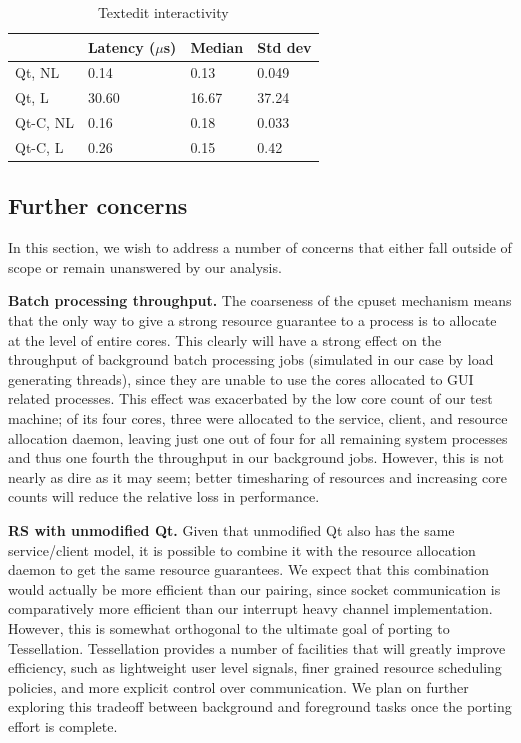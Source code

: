 \documentclass[letterpaper,twocolumn,11pt]{article}
\begin{document}
\begin{table}[htp]
\centering
\begin{tabular}{|l | l | l | l |}
\hline
	&Latency ($\mu$s)	&Median	&Std dev\\ \hline
Qt, NL	&0.14	&0.13	&0.049\\
Qt, L	&30.60	&16.67	&37.24\\
Qt-C, NL	&0.16	&0.18	&0.033\\
Qt-C, L	&0.26	&0.15	&0.42\\
\hline
\end{tabular}
\caption{Textedit interactivity}
\label{tab:textedit_table}
\end{table}

\subsection{Further concerns}

In this section, we wish to address a number of concerns that either fall outside of scope or remain unanswered by our analysis.

\textbf{Batch processing throughput.} The coarseness of the cpuset mechanism means that the only way to give a strong resource guarantee to a process is to allocate at the level of entire cores. This clearly will have a strong effect on the throughput of background batch processing jobs (simulated in our case by load generating threads), since they are unable to use the cores allocated to GUI related processes. This effect was exacerbated by the low core count of our test machine; of its four cores, three were allocated to the service, client, and resource allocation daemon, leaving just one out of four for all remaining system processes and thus one fourth the throughput in our background jobs. However, this is not nearly as dire as it may seem; better timesharing of resources and increasing core counts will reduce the relative loss in performance.

\textbf{RS with unmodified Qt.} Given that unmodified Qt also has the same service/client model, it is possible to combine it with the resource allocation daemon to get the same resource guarantees. We expect that this combination would actually be more efficient than our pairing, since socket communication is comparatively more efficient than our interrupt heavy channel implementation. However, this is somewhat orthogonal to the ultimate goal of porting to Tessellation. Tessellation provides a number of facilities that will greatly improve efficiency, such as lightweight user level signals, finer grained resource scheduling policies, and more explicit control over communication. We plan on further exploring this tradeoff between background and foreground tasks once the porting effort is complete.
\end{document}
